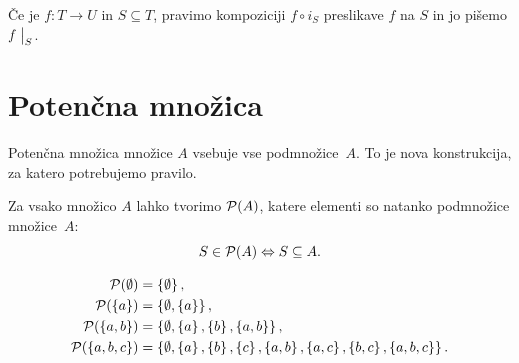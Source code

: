 Če je $f : T \to U$ in $S \subseteq T$, pravimo kompoziciji $f \circ i_S$  preslikave $f$ na $S$ in jo pišemo $f\mathrel{\big|}_{S}$.


\section{Potenčna množica}
\label{sec:potencna-mnozica}

Potenčna množica množice $A$ vsebuje vse podmnožice~$A$. To je nova konstrukcija, za katero potrebujemo pravilo.

\begin{pravilo}
  \label{pravilo:potencna-mnozica}
  Za vsako množico $A$ lahko tvorimo  $\mathcal{P}(A)$, katere elementi so natanko podmnožice množice~$A$:
  \begin{equation*}
    S \in \mathcal{P}(A) \Leftrightarrow S \subseteq A.
  \end{equation*}
\end{pravilo}

\begin{zgled}
  \begin{align*}
    \mathcal{P}(\emptyset) &= \left\{\emptyset\right\}, \\
    \mathcal{P}(\left\{a\right\}) &= \left\{\emptyset, \left\{a\right\}\right\}, \\
    \mathcal{P}(\left\{a,b\right\}) &= \left\{\emptyset, \left\{a\right\}, \left\{b\right\}, \left\{a,b\right\}\right\}, \\
    \mathcal{P}(\left\{a,b,c\right\}) &= \left\{\emptyset, \left\{a\right\}, \left\{b\right\}, \left\{c\right\}, \left\{a,b\right\}, \left\{a,c\right\}, \left\{b,c\right\}, \left\{a,b,c\right\}\right\}.
  \end{align*}
\end{zgled}


